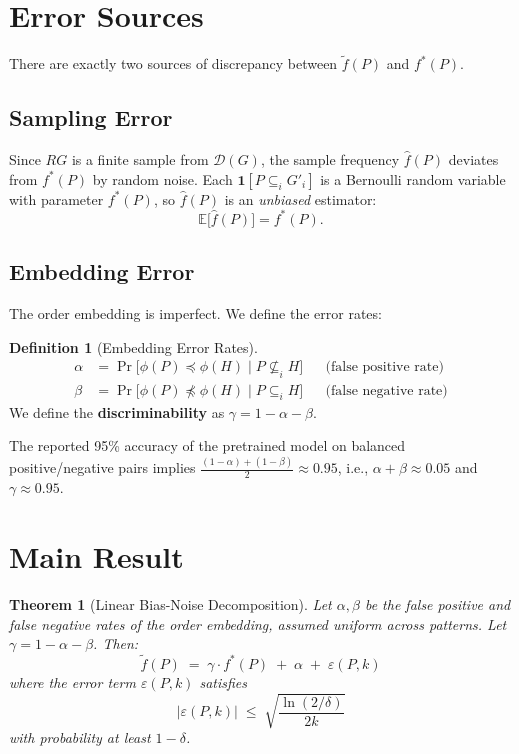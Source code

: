 \documentclass[11pt,a4paper]{article}
\theoremstyle{plain}
\newtheorem{theorem}{Theorem}
\theoremstyle{definition}
\newtheorem{definition}{Definition}
\newcommand{\freq}{\tilde{f}}
\newcommand{\fstar}{f^*}
\newcommand{\fhat}{\hat{f}}
\begin{document}
\section{Error Sources}

There are exactly two sources of discrepancy between $\freq(P)$ and $\fstar(P)$.

\subsection{Sampling Error}

Since $RG$ is a finite sample from $\mathcal{D}(G)$, the sample frequency $\fhat(P)$ deviates from $\fstar(P)$ by random noise. Each $\mathbf{1}[P \subseteq_i G'_i]$ is a Bernoulli random variable with parameter $\fstar(P)$, so $\fhat(P)$ is an \emph{unbiased} estimator:
\[
\mathbb{E}\big[\fhat(P)\big] = \fstar(P).
\]

\subsection{Embedding Error}

The order embedding is imperfect. We define the error rates:

\begin{definition}[Embedding Error Rates]
\begin{align*}
\alpha &= \Pr\!\big[\phi(P) \preceq \phi(H) \;\big|\; P \not\subseteq_i H\big] && \text{(false positive rate)} \\[4pt]
\beta  &= \Pr\!\big[\phi(P) \not\preceq \phi(H) \;\big|\; P \subseteq_i H\big] && \text{(false negative rate)}
\end{align*}
We define the \textbf{discriminability} as $\gamma = 1 - \alpha - \beta$.
\end{definition}

\noindent The reported 95\% accuracy of the pretrained model on balanced positive/negative pairs implies $\frac{(1-\alpha)+(1-\beta)}{2} \approx 0.95$, i.e., $\alpha + \beta \approx 0.05$ and $\gamma \approx 0.95$.

\section{Main Result}

\begin{theorem}[Linear Bias-Noise Decomposition]\label{thm:main}
Let $\alpha, \beta$ be the false positive and false negative rates of the order embedding, assumed uniform across patterns. Let $\gamma = 1 - \alpha - \beta$. Then:
\[
\boxed{\;\freq(P) \;=\; \gamma \cdot \fstar(P) \;+\; \alpha \;+\; \varepsilon(P, k)\;}
\]
where the error term $\varepsilon(P, k)$ satisfies
\[
\big|\varepsilon(P, k)\big| \;\leq\; \sqrt{\frac{\ln(2/\delta)}{2k}}
\]
with probability at least $1 - \delta$.
\end{theorem}
\end{document}
